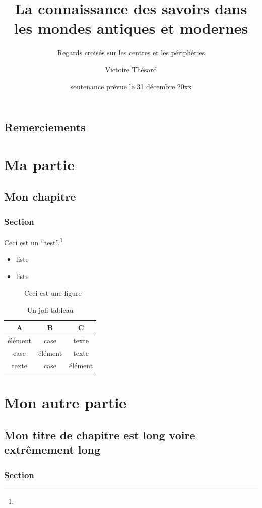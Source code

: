\documentclass[a4paper,11pt]{book}
\title{La connaissance des savoirs dans les mondes antiques et modernes}
\subtitle{Regards croisés sur les centres et les périphéries}
\author{Victoire Thésard}
\date{soutenance prévue le 31 décembre 20xx}%
\begin{document}
\maketitle

\frontmatter
\chapter{Remerciements}
\kant[1]
\mainmatter
\part{Ma partie}
\chapter{Mon chapitre}

\section{Section}
Ceci est un \enquote{test}.\footnote{\kant[1]}
\kant[1-2]
\begin{itemize}
 \item liste
 \item liste
\end{itemize}

\begin{figure}
 \centering
 \caption{Ceci est une figure}
\end{figure}

\begin{table}[htb]
\centering
\caption{Un joli tableau}\label{tab:joli}
\begin{tabular}{ccc}\toprule
A & B & C\\\midrule
élément & case & texte\\
case & élément & texte \\
texte & case & élément \\
\bottomrule\end{tabular}
\end{table}

\part{Mon autre partie}

\chapter{Mon titre de chapitre est long voire extrêmement long}
\section{Section}
\end{document}
